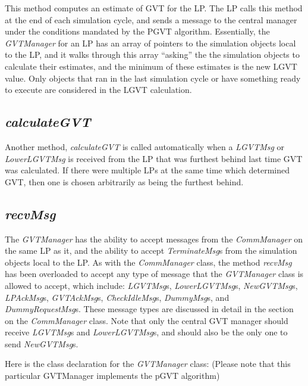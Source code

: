 \documentclass[11pt]{report}
\begin{document}
This method computes an estimate of GVT for the LP.  The LP calls this
method at the end of each simulation cycle, and sends a message to the
central manager under the conditions mandated by the PGVT algorithm.
Essentially, the {\it GVTManager} for an LP has an array of pointers to
the simulation objects local to the LP, and it walks through this array
``asking'' the the simulation objects to calculate their estimates, and
the minimum of these estimates is the new LGVT value.  Only objects that
ran in the last simulation cycle or have something ready to execute are
considered in the LGVT calculation.

\subsection{{\it calculateGVT}}

Another method, {\it calculateGVT} is called automatically when a {\it
LGVTMsg} or {\it LowerLGVTMsg} is received from the LP that was furthest
behind last time GVT was calculated.  If there were multiple LPs at the
same time which determined GVT, then one is chosen arbitrarily as being
the furthest behind.

\subsection{{\it recvMsg}}

The {\it GVTManager} has the ability to accept messages from the {\it
CommManager} on the same LP as it, and the ability to accept {\it
TerminateMsg}s from the simulation objects local to the LP.  As with the
{\it CommManager} class, the method {\it recvMsg} has been overloaded to
accept any type of message that the {\it GVTManager} class is allowed to
accept, which include: {\it LGVTMsg}s, {\it LowerLGVTMsg}s, {\it
NewGVTMsg}s, {\it LPAckMsg}s, {\it GVTAckMsg}s, {\it CheckIdleMsg}s, {\it
DummyMsg}s, and {\it DummyRequestMsg}s.  These message types are discussed
in detail in the section on the {\it CommManager} class.  Note that only
the central GVT manager should receive {\it LGVTMsg}s and {\it
LowerLGVTMsg}s, and should also be the only one to send {\it NewGVTMsg}s.

Here is the class declaration for the {\it GVTManager} class:
(Please note that this particular GVTManager implements the pGVT algorithm)
\end{document}
